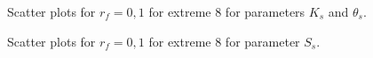 \documentclass[review,times,3p,twocolumn,10pt]{elsarticle}
\begin{document}
\begin{figure}[htb!]
\label{ext6rf0-Kt3}
\caption{Scatter plots for $r_f=0,1$ for extreme 8 for parameters $K_s$ and $\theta_s$. }
\end{figure}

\begin{figure}[htb!]
\label{ext6rf0-Ss3}
\caption{Scatter plots for $r_f=0,1$ for extreme 8 for parameter $S_s$.}
\end{figure}
\end{document}
